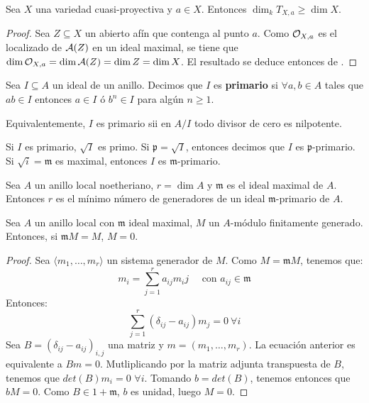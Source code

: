\documentclass[ACGA.tex]{subfiles}
\begin{document}
\begin{prop}
 Sea $X$ una variedad cuasi-proyectiva y $a\in X$. Entonces $\dim_k T_{X,a}\geq \dim X$. 
\end{prop}

\begin{proof}
 Sea $Z\subseteq X$ un abierto afín que contenga al punto $a$. Como ${\cal O}_{X,a}$ es el localizado de $\mathcal{A}(Z)$ en un ideal maximal, se tiene que $\dim{\cal O}_{X,a}=\dim\mathcal{A}(Z)=\dim Z=\dim X$. El resultado se deduce entonces de \cite[corolario 11.15]{am}. 
\end{proof}

\begin{defi}
Sea $I \subseteq A$ un ideal de un anillo. Decimos que $I$ es \textbf{primario} si $\forall a,b \in A$ tales que $ab \in I$ entonces $a \in I$ ó $b^n \in I$ para algún $n ≥ 1$.

Equivalentemente, $I$ es primario sii en $A/I$ todo divisor de cero es nilpotente.
\end{defi}

\begin{prop}
Si $I$ es primario, $\sqrt{I}$ es primo. Si $\mathfrak{p} = \sqrt{I}$, entonces decimos que $I$ es $\mathfrak{p}$-primario. Si $\sqrt{i}=\mathfrak{m}$ es maximal, entonces $I$ es $\mathfrak{m}$-primario.
\end{prop}

\begin{prop}
Sea $A$ un anillo local noetheriano, $r = \dim A$ y $\mathfrak{m}$ es el ideal maximal de $A$. Entonces $r$ es el mínimo número de generadores de un ideal $\mathfrak{m}$-primario de $A$.
\end{prop}

\begin{lemma}
Sea $A$ un anillo local con $\mathfrak{m}$ ideal maximal, $M$ un $A$-módulo finitamente generado. Entonces, si $\mathfrak{m} M = M$, $M = 0$.
\end{lemma}

\begin{proof}
Sea $\langle m_1,\dots,m_r\rangle$ un sistema generador de $M$. Como $M = \mathfrak{m} M$, tenemos que:
\[ m_i = \sum_{j=1}^r a_{ij} m_ij \quad \text{ con } a_{ij} \in \mathfrak{m} \]
Entonces:
\[ \sum_{j=1}^r (\delta_{ij} - a_{ij}) m_j = 0 \ \forall i \]
Sea $B = (\delta_{ij}-a_{ij})_{i,j}$ una matriz y $m=(m_1,\dots,m_r)$. La ecuación anterior es equivalente a $B m = 0$. Mutliplicando por la matriz adjunta transpuesta de $B$, tenemos que $det(B) m_i = 0$ $\forall i$. Tomando $b = det(B)$, tenemos entonces que $b M = 0$. Como $B \in 1 + \mathfrak{m}$, $b$ es unidad, luego $M = 0$.
\end{proof}
\end{document}
